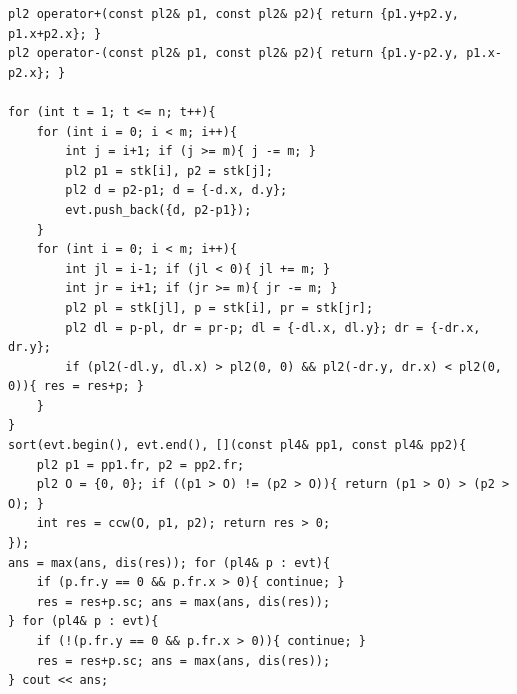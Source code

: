 \begin{verbatim}
pl2 operator+(const pl2& p1, const pl2& p2){ return {p1.y+p2.y, p1.x+p2.x}; }
pl2 operator-(const pl2& p1, const pl2& p2){ return {p1.y-p2.y, p1.x-p2.x}; }

for (int t = 1; t <= n; t++){
	for (int i = 0; i < m; i++){
		int j = i+1; if (j >= m){ j -= m; }
		pl2 p1 = stk[i], p2 = stk[j];
		pl2 d = p2-p1; d = {-d.x, d.y};
		evt.push_back({d, p2-p1});
	}
	for (int i = 0; i < m; i++){
		int jl = i-1; if (jl < 0){ jl += m; }
		int jr = i+1; if (jr >= m){ jr -= m; }
		pl2 pl = stk[jl], p = stk[i], pr = stk[jr];
		pl2 dl = p-pl, dr = pr-p; dl = {-dl.x, dl.y}; dr = {-dr.x, dr.y};
		if (pl2(-dl.y, dl.x) > pl2(0, 0) && pl2(-dr.y, dr.x) < pl2(0, 0)){ res = res+p; }
	}
}
sort(evt.begin(), evt.end(), [](const pl4& pp1, const pl4& pp2){
	pl2 p1 = pp1.fr, p2 = pp2.fr;
	pl2 O = {0, 0}; if ((p1 > O) != (p2 > O)){ return (p1 > O) > (p2 > O); }
	int res = ccw(O, p1, p2); return res > 0;
});
ans = max(ans, dis(res)); for (pl4& p : evt){
	if (p.fr.y == 0 && p.fr.x > 0){ continue; }
	res = res+p.sc; ans = max(ans, dis(res));
} for (pl4& p : evt){
	if (!(p.fr.y == 0 && p.fr.x > 0)){ continue; }
	res = res+p.sc; ans = max(ans, dis(res));
} cout << ans;
\end{verbatim}
